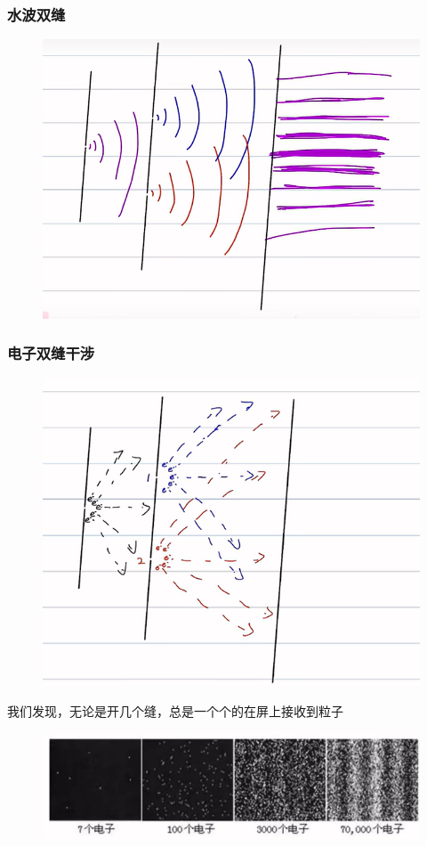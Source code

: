 \documentclass[lang=cn,15pt]{elegantbook}
\begin{document}
\subsubsection{水波双缝}
\begin{figure}[H]
	\centering
	\includegraphics[width=0.7\linewidth]{figure/screenshot005}
\end{figure}
\subsubsection{电子双缝干涉}
\begin{figure}[H]
	\centering
	\includegraphics[width=0.7\linewidth]{figure/screenshot006}
\end{figure}
我们发现，无论是开几个缝，总是一个个的在屏上接收到粒子
\begin{figure}[H]
	\centering
	\includegraphics[width=0.7\linewidth]{figure/screenshot007}
\end{figure}
\end{document}
